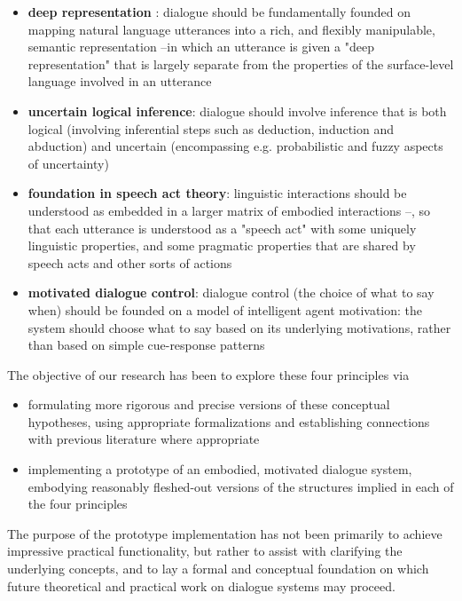 \begin{englishabstract}
\begin{itemize}
\begin{itemize}
\item {\bf deep representation }: dialogue should be fundamentally founded on mapping natural language utterances into a rich, and flexibly manipulable, semantic representation --in which an utterance is given a "deep representation" that is largely separate from the properties of the surface-level language involved in an utterance
\item {\bf uncertain logical inference}: dialogue should involve inference that is both logical (involving inferential steps such as deduction, induction and abduction) and uncertain (encompassing e.g. probabilistic and fuzzy aspects of uncertainty)
\item {\bf foundation in speech act theory}: linguistic interactions should be understood as embedded in a larger matrix of embodied interactions --, so that each utterance is understood as a "speech act" with some uniquely linguistic properties, and some pragmatic properties that are shared by speech acts and other sorts of actions
\item {\bf motivated dialogue control}:  dialogue control (the choice of what to say when) should be founded on a model of intelligent agent motivation: the system should choose what to say based on its underlying motivations, rather than based on simple cue-response patterns
\end{itemize} 

The objective of our research has been to explore these four principles via

\begin{itemize}
\item formulating more rigorous and precise versions of these conceptual hypotheses, using appropriate formalizations and establishing connections with previous literature where appropriate
\item implementing a prototype of an embodied, motivated dialogue system, embodying reasonably fleshed-out versions of the structures implied in each of the four principles
\end{itemize}

The purpose of the prototype implementation has not been primarily to achieve impressive practical functionality, but rather to assist with clarifying the underlying concepts, and to lay a formal and conceptual foundation on which future theoretical and practical work on dialogue systems may proceed.


\end{itemize}
\end{englishabstract}
